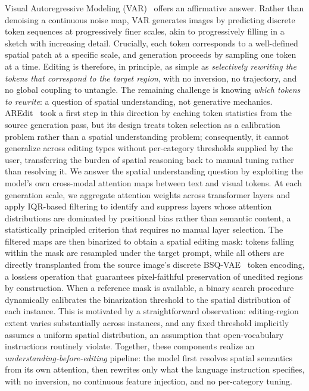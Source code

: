 Visual Autoregressive Modeling (VAR)~\cite{VAR} offers an affirmative answer. Rather than denoising a continuous noise map, VAR generates images by predicting discrete token sequences at progressively finer scales, akin to progressively filling in a sketch with increasing detail. Crucially, each token corresponds to a well-defined spatial patch at a specific scale, and generation proceeds by sampling one token at a time. Editing is therefore, in principle, as simple as \textit{selectively rewriting the tokens that correspond to the target region}, with no inversion, no trajectory, and no global coupling to untangle. The remaining challenge is knowing \textit{which tokens to rewrite}: a question of spatial understanding, not generative mechanics. AREdit~\cite{AREdit} took a first step in this direction by caching token statistics from the source generation pass, but its design treats token selection as a calibration problem rather than a spatial understanding problem; consequently, it cannot generalize across editing types without per-category thresholds supplied by the user, transferring the burden of spatial reasoning back to manual tuning rather than resolving it.
We answer the spatial understanding question by exploiting the model's own cross-modal attention maps between text and visual tokens. At each generation scale, we aggregate attention weights across transformer layers and apply IQR-based filtering to identify and suppress layers whose attention distributions are dominated by positional bias rather than semantic content, a statistically principled criterion that requires no manual layer selection. The filtered maps are then binarized to obtain a spatial editing mask: tokens falling within the mask are resampled under the target prompt, while all others are directly transplanted from the source image's discrete BSQ-VAE~\cite{BSQVAE} token encoding, a lossless operation that guarantees pixel-faithful preservation of unedited regions by construction. When a reference mask is available, a binary search procedure dynamically calibrates the binarization threshold to the spatial distribution of each instance. This is motivated by a straightforward observation: editing-region extent varies substantially across instances, and any fixed threshold implicitly assumes a uniform spatial distribution, an assumption that open-vocabulary instructions routinely violate. Together, these components realize an \textit{understanding-before-editing} pipeline: the model first resolves spatial semantics from its own attention, then rewrites only what the language instruction specifies, with no inversion, no continuous feature injection, and no per-category tuning.

